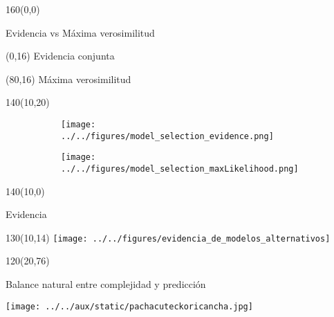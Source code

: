 \documentclass[shownotes,aspectratio=169]{beamer}
\begin{document}
\begin{frame}[plain]
\begin{textblock}{160}(0,0)
\begin{center}
 \large Evidencia vs M\'axima verosimilitud
\end{center}
\end{textblock}



\begin{textblock}{80}(0,16)
 \centering
Evidencia conjunta
\end{textblock}

\begin{textblock}{80}(80,16)
 \centering
 M\'axima verosimilitud
\end{textblock}


\begin{textblock}{140}(10,20)
     \centering 
       \begin{figure}[H]     
     \centering 
     \begin{subfigure}[b]{0.47\textwidth}
       \texttt{[image: ../../figures/model\_selection\_evidence.png]}
     \end{subfigure}
     \begin{subfigure}[b]{0.49\textwidth}
       \texttt{[image: ../../figures/model\_selection\_maxLikelihood.png]}
     \end{subfigure}
\end{figure}
\end{textblock}


\end{frame}


\begin{frame}[plain]
\begin{textblock}{140}(10,0)
 \begin{center}
  \Large  Evidencia
 \end{center}
\end{textblock}


 \begin{textblock}{130}(10,14)
  \centering
  \texttt{[image: ../../figures/evidencia\_de\_modelos\_alternativos]} 
 \end{textblock} 
 
 
 \begin{textblock}{120}(20,76)
  \begin{mdframed}[backgroundcolor=black!15]
\centering
  Balance natural entre complejidad y predicci\'on
  \end{mdframed}
 \end{textblock}
\end{frame}
 
\begin{frame}[plain]
\centering
  \texttt{[image: ../../aux/static/pachacuteckoricancha.jpg]}
\end{frame}
\end{document}
